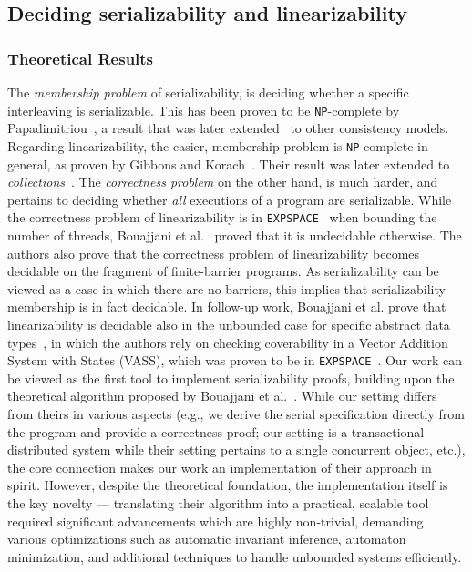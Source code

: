 \subsection{Deciding serializability and linearizability}

\subsubsection{Theoretical Results}
%
The \textit{membership problem} of serializability, is deciding whether a 
specific interleaving is serializable. This has been proven to be 
\texttt{NP}-complete 
by Papadimitriou~\cite{Pa79}, a result that was later extended~\cite{BiEn19} to 
other consistency models.
Regarding linearizability, the easier, membership problem is 
\texttt{NP}-complete in 
general, as proven by Gibbons and Korach~\cite{GiKo97}. Their result was later 
extended to \textit{collections}~\cite{EmEn18}.
%
The \textit{correctness problem} on the other hand, is much harder, and 
pertains to deciding whether \textit{all} executions of a program are 
serializable.
%
While the correctness problem of linearizability is in 
\texttt{EXPSPACE}~\cite{AlMcPe96} when bounding the number of threads, 
 Bouajjani et al.~\cite{BoEmEnHa13} proved that it is undecidable otherwise. 
 The authors also prove that the correctness problem of 
linearizability becomes decidable on the fragment of finite-barrier programs. 
As serializability can be viewed as a case in which there are no barriers, this 
implies that serializability membership is in fact decidable. 
%
In follow-up work, Bouajjani et al. prove that linearizability is decidable 
also 
in the unbounded case for specific abstract data types~\cite{BoEmEnHa18}, in 
which the authors rely on checking coverability in a Vector Addition System 
with States (VASS), which was proven to be in \texttt{EXPSPACE}~\cite{Ra78}.
%
Our work can be viewed as the first tool to implement serializability proofs, 
building upon the theoretical algorithm proposed by Bouajjani et 
al.~\cite{BoEmEnHa13}. While our setting differs from theirs in various aspects 
(e.g., we derive 
the serial specification directly from the program and provide a correctness 
proof; our setting is a transactional distributed system while their setting pertains to a single concurrent object, etc.), the core connection makes our work an implementation of their approach 
in spirit. However, despite the theoretical foundation, the implementation 
itself is the key novelty --- translating their algorithm into a practical, 
scalable tool required significant advancements which are highly
non-trivial, demanding various optimizations such as automatic invariant 
inference, automaton minimization, and additional techniques to handle 
unbounded systems efficiently. 




